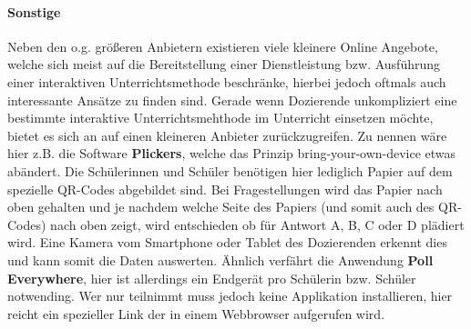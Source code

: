 \paragraph{Sonstige}
Neben den o.g. größeren Anbietern existieren viele kleinere Online Angebote, welche sich meist auf die Bereitstellung einer Dienstleistung bzw. Ausführung einer interaktiven Unterrichtsmethode beschränke, hierbei jedoch oftmals auch interessante Ansätze zu finden sind. Gerade wenn Dozierende unkompliziert eine bestimmte interaktive Unterrichtsmehthode im Unterricht einsetzen möchte, bietet es sich an auf einen kleineren Anbieter zurückzugreifen. Zu nennen wäre hier z.B. die Software \textbf{Plickers}, welche das Prinzip bring-your-own-device etwas abändert. Die Schülerinnen und Schüler benötigen hier lediglich Papier auf dem spezielle QR-Codes abgebildet sind. Bei Fragestellungen wird das Papier nach oben gehalten und je nachdem welche Seite des Papiers (und somit auch des QR-Codes) nach oben zeigt, wird entschieden ob für Antwort A, B, C oder D plädiert wird. Eine Kamera vom Smartphone oder Tablet des Dozierenden erkennt dies und kann somit die Daten auswerten. Ähnlich verfährt die Anwendung \textbf{Poll Everywhere}, hier ist allerdings ein Endgerät pro Schülerin bzw. Schüler notwending. Wer nur teilnimmt muss jedoch keine Applikation installieren, hier reicht ein spezieller Link der in einem Webbrowser aufgerufen wird.  
